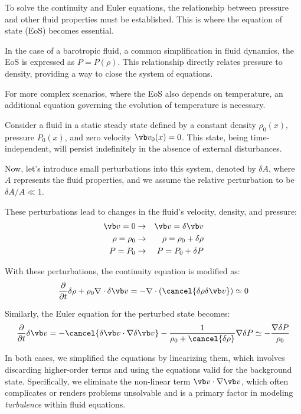 To solve the continuity and Euler equations, the relationship between pressure and other fluid properties must be established. This is where the equation of state (EoS) becomes essential.

In the case of a barotropic fluid, a common simplification in fluid dynamics, the EoS is expressed as \( P=P(\rho) \). This relationship directly relates pressure to density, providing a way to close the system of equations.

For more complex scenarios, where the EoS also depends on temperature, an additional equation governing the evolution of temperature is necessary. 


Consider a fluid in a static steady state defined by a constant density \( \rho_0(x) \), pressure \( P_0(x) \), and zero velocity \( \vb v_0(x) = 0 \). This state, being time-independent, will persist indefinitely in the absence of external disturbances.

Now, let's introduce small perturbations into this system, denoted by \( \delta A \), where \( A \) represents the fluid properties, and we assume the relative perturbation to be \( \delta A / A \ll 1 \). 

These perturbations lead to changes in the fluid's velocity, density, and pressure:
%
\begin{eqnarray}
\vb v = 0 & \rightarrow & \vb v = \delta \vb v \\
\rho = \rho_0 & \rightarrow & \rho = \rho_0 + \delta \rho \\
P = P_0 & \rightarrow & P = P_0 + \delta P
\end{eqnarray}

With these perturbations, the continuity equation is modified as:
%
\begin{equation}
\frac{\partial}{\partial t} \delta \rho + \rho_0 \nabla \cdot \delta \vb v = - \nabla \cdot ( \cancel{\delta \rho \delta \vb v}) \simeq 0
\end{equation}

Similarly, the Euler equation for the perturbed state becomes:
%
\begin{equation}
\frac{\partial}{\partial t} \delta \vb v = -\cancel{\delta \vb v \cdot \nabla \delta \vb v} - \frac{1}{\rho_0 + \cancel{\delta \rho}} \nabla \delta P \simeq - \frac{\nabla \delta P}{\rho_0} 
\end{equation}

In both cases, we simplified the equations by linearizing them, which involves discarding higher-order terms and using the equations valid for the background state. Specifically, we eliminate the non-linear term \( \vb v \cdot \nabla \vb v \), which often complicates or renders problems unsolvable and is a primary factor in modeling \emph{turbulence} within fluid equations.

